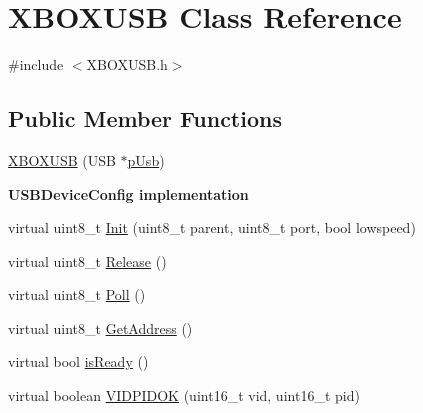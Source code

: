\hypertarget{class_x_b_o_x_u_s_b}{\section{\-X\-B\-O\-X\-U\-S\-B \-Class \-Reference}
\label{class_x_b_o_x_u_s_b}
}


{\ttfamily \#include $<$\-X\-B\-O\-X\-U\-S\-B.\-h$>$}

\subsection*{\-Public \-Member \-Functions}
\begin{DoxyCompactItemize}
\item 
\hyperlink{class_x_b_o_x_u_s_b_a4b676a33152112e6edfb14be125a78d2}{\-X\-B\-O\-X\-U\-S\-B} (\-U\-S\-B $\ast$\hyperlink{class_x_b_o_x_u_s_b_a9c701658d4f63b5407cbcd5b78d8eb18}{p\-Usb})
\end{DoxyCompactItemize}
\begin{Indent}{\bf \-U\-S\-B\-Device\-Config implementation}\par
\begin{DoxyCompactItemize}
\item 
virtual uint8\-\_\-t \hyperlink{class_x_b_o_x_u_s_b_a9d2ad06354787bc252058bb28015b56e}{\-Init} (uint8\-\_\-t parent, uint8\-\_\-t port, bool lowspeed)
\item 
virtual uint8\-\_\-t \hyperlink{class_x_b_o_x_u_s_b_a9a296b98b40f5a36d46297d98ef0f9b5}{\-Release} ()
\item 
virtual uint8\-\_\-t \hyperlink{class_x_b_o_x_u_s_b_a2f4684fe0785e50de434d95f4336fa12}{\-Poll} ()
\item 
virtual uint8\-\_\-t \hyperlink{class_x_b_o_x_u_s_b_a42c870e64582980634423248d64500b4}{\-Get\-Address} ()
\item 
virtual bool \hyperlink{class_x_b_o_x_u_s_b_ac2507bfe85896b7fcc772894a7a9f272}{is\-Ready} ()
\item 
virtual boolean \hyperlink{class_x_b_o_x_u_s_b_aa25ae7e9161bf1f4cc03a007738a292b}{\-V\-I\-D\-P\-I\-D\-O\-K} (uint16\-\_\-t vid, uint16\-\_\-t pid)
\end{DoxyCompactItemize}
\end{Indent}
